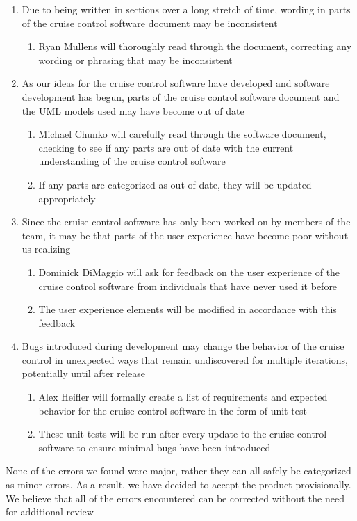 \documentclass{article}
\begin{document}
	\begin{enumerate}
		\item Due to being written in sections over a long stretch of time, wording in parts of the cruise control software document may be inconsistent
		\begin{enumerate}
			\item Ryan Mullens will thoroughly read through the document, correcting any wording or phrasing that may be inconsistent
		\end{enumerate}
	
		\item As our ideas for the cruise control software have developed and software development has begun, parts of the cruise control software document and the UML models used may have become out of date
		\begin{enumerate}
			\item Michael Chunko will carefully read through the software document, checking to see if any parts are out of date with the current understanding of the cruise control software
			\item If any parts are categorized as out of date, they will be updated appropriately
		\end{enumerate}
	
		\item Since the cruise control software has only been worked on by members of the team, it may be that parts of the user experience have become poor without us realizing
		\begin{enumerate}
			\item Dominick DiMaggio will ask for feedback on the user experience  of the cruise control software from individuals that have never used it before
			\item The user experience elements will be modified in accordance with this feedback
		\end{enumerate}
	
		\item Bugs introduced during development may change the behavior of the cruise control in unexpected ways that remain undiscovered for multiple iterations, potentially until after release
		\begin{enumerate}
			\item Alex Heifler will formally create a list of requirements and expected behavior for the cruise control software in the form of unit test
			\item These unit tests will be run after every update to the cruise control software to ensure minimal bugs have been introduced
		\end{enumerate}
	\end{enumerate}

	None of the errors we found were major, rather they can all safely be categorized as minor errors. As a result, we have decided to accept the product provisionally. We believe that all of the errors encountered can be corrected without the need for additional review
\end{document}
